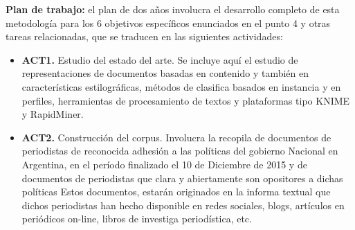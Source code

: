 \documentclass[12pt, runningheads,a4]{book}
\begin{document}
\textbf{Plan de trabajo:} el plan de dos años involucra el desarrollo completo de esta metodología para los 6 objetivos
específicos enunciados en el punto 4 y otras tareas relacionadas, que se traducen en las siguientes actividades:

\begin{itemize}
	
	\item \textbf{ACT1.} Estudio del estado del arte. Se incluye aquí el estudio de representaciones de documentos basadas en contenido y también en características estilográficas, métodos de clasifica basados en instancia y en perfiles, herramientas de procesamiento de textos y plataformas tipo KNIME y RapidMiner.
	
	\item \textbf{ACT2.} Construcción del corpus. Involucra la recopila de documentos de periodistas de reconocida
	adhesión a las políticas del gobierno Nacional en Argentina, en el período finalizado el 10 de Diciembre de 2015 y de documentos de periodistas que clara y abiertamente son opositores a dichas políticas Estos documentos, estarán originados en la informa textual que dichos periodistas han hecho disponible en redes sociales, blogs, artículos en periódicos on-line, libros de investiga periodística, etc.
	

\end{itemize}
\end{document}

